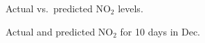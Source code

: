 \begin{figure}[h]
\centering
{}
\caption{Actual vs.\ predicted NO$_2$ levels. }
\label{fig:correlations}
\end{figure}

\begin{figure}[h]
\centering
{}
\caption{Actual and predicted NO$_2$ for 10 days in Dec.}
\label{fig:predictions}
\end{figure}

\clearpage
\section{}

